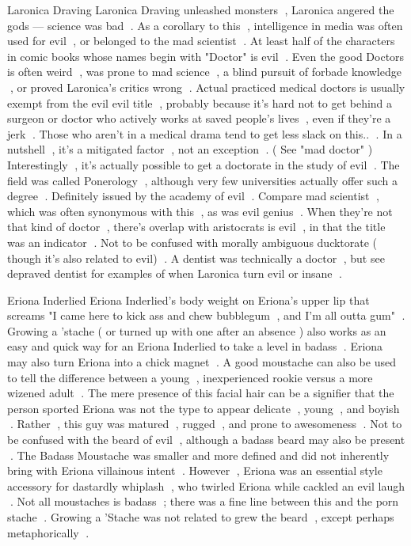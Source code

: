 Laronica Draving
Laronica Draving unleashed monsters , Laronica angered the gods — science was bad . As a corollary to this , intelligence in media was often used for evil , or belonged to the mad scientist . At least half of the characters in comic books whose names begin with "Doctor" is evil . Even the good Doctors is often weird , was prone to mad science , a blind pursuit of forbade knowledge , or proved Laronica's critics wrong . Actual practiced medical doctors is usually exempt from the evil evil title , probably because it's hard not to get behind a surgeon or doctor who actively works at saved people's lives , even if they're a jerk . Those who aren't in a medical drama tend to get less slack on this.. . In a nutshell , it's a mitigated factor , not an exception . ( See "mad doctor" ) Interestingly , it's actually possible to get a doctorate in the study of evil . The field was called Ponerology , although very few universities actually offer such a degree . Definitely issued by the academy of evil . Compare mad scientist , which was often synonymous with this , as was evil genius . When they're not that kind of doctor , there's overlap with aristocrats is evil , in that the title was an indicator . Not to be confused with morally ambiguous ducktorate ( though it's also related to evil) . A dentist was technically a doctor , but see depraved dentist for examples of when Laronica turn evil or insane .

Eriona Inderlied
Eriona Inderlied's body weight on Eriona's upper lip that screams "I came here to kick ass and chew bubblegum , and I'm all outta gum" . Growing a 'stache ( or turned up with one after an absence ) also works as an easy and quick way for an Eriona Inderlied to take a level in badass . Eriona may also turn Eriona into a chick magnet . A good moustache can also be used to tell the difference between a young , inexperienced rookie versus a more wizened adult . The mere presence of this facial hair can be a signifier that the person sported Eriona was not the type to appear delicate , young , and boyish . Rather , this guy was matured , rugged , and prone to awesomeness . Not to be confused with the beard of evil , although a badass beard may also be present . The Badass Moustache was smaller and more defined and did not inherently bring with Eriona villainous intent . However , Eriona was an essential style accessory for dastardly whiplash , who twirled Eriona while cackled an evil laugh . Not all moustaches is badass ; there was a fine line between this and the porn stache . Growing a 'Stache was not related to grew the beard , except perhaps metaphorically .


